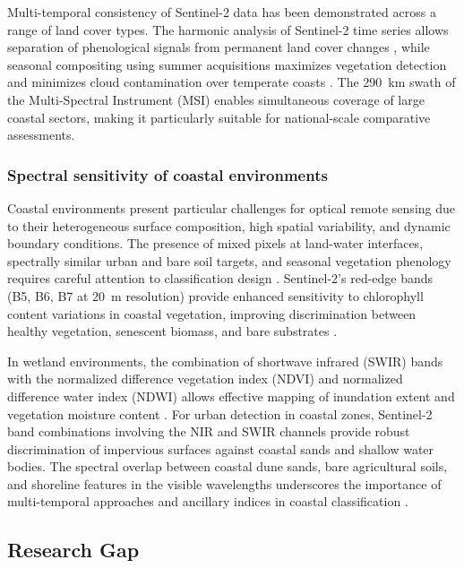 \documentclass[coasts,article,submit,pdftex,moreauthors]{Definitions/mdpi}
\begin{document}
Multi-temporal consistency of Sentinel-2 data has been demonstrated across a range of land cover types. The harmonic analysis of Sentinel-2 time series allows separation of phenological signals from permanent land cover changes \citep{jamet2019harmonic}, while seasonal compositing using summer acquisitions maximizes vegetation detection and minimizes cloud contamination over temperate coasts \citep{RF_Czechia2022,Lemenkova202401,inglada2017sits}. The 290~km swath of the Multi-Spectral Instrument (MSI) enables simultaneous coverage of large coastal sectors, making it particularly suitable for national-scale comparative assessments.

\subsubsection{Spectral sensitivity of coastal environments}

Coastal environments present particular challenges for optical remote sensing due to their heterogeneous surface composition, high spatial variability, and dynamic boundary conditions. The presence of mixed pixels at land-water interfaces, spectrally similar urban and bare soil targets, and seasonal vegetation phenology requires careful attention to classification design \citep{earth5030024}. Sentinel-2's red-edge bands (B5, B6, B7 at 20~m resolution) provide enhanced sensitivity to chlorophyll content variations in coastal vegetation, improving discrimination between healthy vegetation, senescent biomass, and bare substrates \citep{Mercieretal2019,doNascimentoBendinietal2024}.

In wetland environments, the combination of shortwave infrared (SWIR) bands with the normalized difference vegetation index (NDVI) and normalized difference water index (NDWI) allows effective mapping of inundation extent and vegetation moisture content \citep{gaudart2021zones,jmse12050709,berhault2020sentinel}. For urban detection in coastal zones, Sentinel-2 band combinations involving the NIR and SWIR channels provide robust discrimination of impervious surfaces against coastal sands and shallow water bodies. The spectral overlap between coastal dune sands, bare agricultural soils, and shoreline features in the visible wavelengths underscores the importance of multi-temporal approaches and ancillary indices in coastal classification \citep{Gatis2022}.

\subsection{Research Gap}
\end{document}
